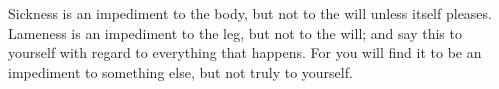 Sickness is an impediment to the body, but not to the will unless itself
pleases. Lameness is an impediment to the leg, but not to the will; and
say this to yourself with regard to everything that happens. For you will
find it to be an impediment to something else, but not truly to yourself.

